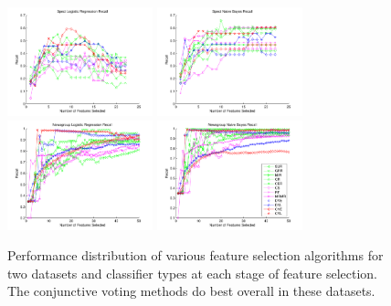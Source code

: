 \begin{figure}[tbp!]
\centering
\includegraphics[width=0.375\textwidth]{./figures/linegraphs/SpectLogisticRegressionRecall.pdf}
\includegraphics[width=0.375\textwidth]{./figures/linegraphs/SpectNaiveBayesRecall.pdf}\\
\includegraphics[width=0.375\textwidth]{./figures/linegraphs/NewsgroupLogisticRegressionRecall.pdf}
\includegraphics[width=0.375\textwidth]{./figures/linegraphs/NewsgroupNaiveBayesRecall.pdf}
\caption{\footnotesize Performance distribution of various feature selection algorithms for two datasets and classifier types at each stage of feature selection.  The conjunctive voting methods do best overall in these datasets.}
\label{fig:perf_vs_fs_alg}
\end{figure}

